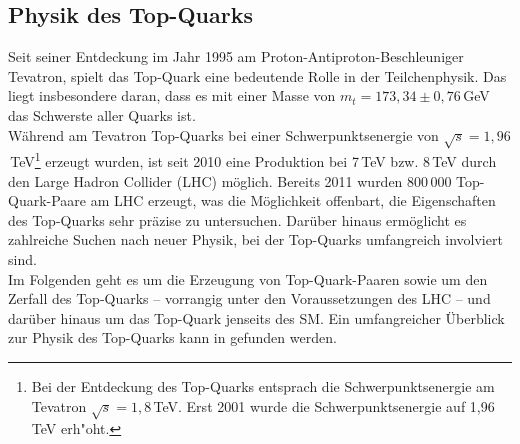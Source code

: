 \subsection{Physik des Top-Quarks}
\label{kaptop}
Seit seiner Entdeckung im Jahr 1995 am Proton-Antiproton-Beschleuniger Tevatron, spielt das Top-Quark eine bedeutende Rolle in der Teilchenphysik. Das liegt insbesondere daran, dass es mit einer Masse von $m_{t}=173,34\pm 0,76$\,GeV \cite{ATLAS:2014wva} das Schwerste aller Quarks ist.\\
W\"ahrend am Tevatron Top-Quarks bei einer Schwerpunkts\-energie von $\sqrt{s}=1,96$\,TeV\footnote{Bei der Entdeckung des Top-Quarks entsprach die Schwerpunkts\-energie am Tevatron $\sqrt{s}=1,8$\,TeV. Erst 2001 wurde die Schwerpunkts\-energie auf 1,96\,TeV erh"oht.} erzeugt wurden, ist seit 2010 eine Produktion bei 7\,TeV bzw. 8\,TeV durch den Large Hadron Collider (LHC) m\"oglich. Bereits 2011 wurden 800\,000 Top-Quark-Paare am LHC erzeugt, was die M\"oglichkeit offenbart, die Eigenschaften des Top-Quarks sehr pr\"azise zu untersuchen. Dar\"uber hinaus erm\"oglicht es zahlreiche Suchen nach neuer Physik, bei der Top-Quarks umfangreich involviert sind.\\
Im Folgenden geht es um die Erzeugung von Top-Quark-Paaren sowie um den Zerfall des Top-Quarks -- vorrangig unter den Voraussetzungen des LHC -- und dar\"uber hinaus um das Top-Quark jenseits des SM. Ein umfangreicher \"Uberblick zur Physik des Top-Quarks kann in \cite{Bernreuther, Schilling} gefunden werden.


